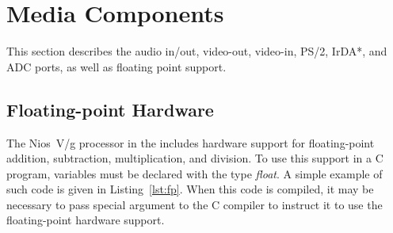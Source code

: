 \section{Media Components}
\label{sec:multi}

This section describes the audio in/out, video-out, video-in, PS/2, IrDA*, and ADC ports,
as well as floating point support.










\subsection{Floating-point Hardware}
\label{sec:fp}

The Nios~V/g processor in the includes hardware support for
floating-point addition, subtraction, multiplication, and division. To use this support in
a C program, variables must be declared with the type {\it float}. A simple example of 
such code is given in Listing~\ref{lst:fp}. When this code is compiled, it may be necessary 
to pass special argument to the C compiler to instruct it to 
use the floating-point hardware support.

